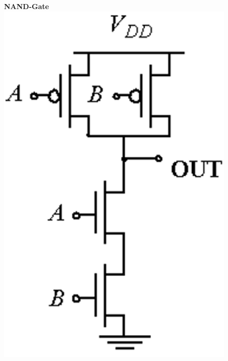 \begin{minipage}[t]{0.27\columnwidth}
    \begin{center}
        \textbf{NAND-Gate} \\
        \includegraphics[width=\columnwidth]{images/cmos_nand_2.png}
    \end{center}
\end{minipage}
\hfill
